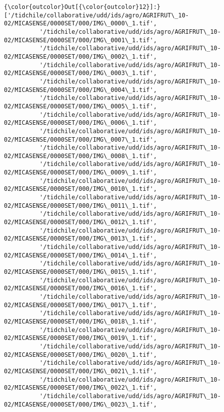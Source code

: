 \documentclass[11pt]{article}
\begin{document}
\begin{Verbatim}[commandchars=\\\{\}]
{\color{outcolor}Out[{\color{outcolor}12}]:} ['/tidchile/collaborative/udd/ids/agro/AGRIFRUT\_10-02/MICASENSE/0000SET/000/IMG\_0000\_1.tif',
          '/tidchile/collaborative/udd/ids/agro/AGRIFRUT\_10-02/MICASENSE/0000SET/000/IMG\_0001\_1.tif',
          '/tidchile/collaborative/udd/ids/agro/AGRIFRUT\_10-02/MICASENSE/0000SET/000/IMG\_0002\_1.tif',
          '/tidchile/collaborative/udd/ids/agro/AGRIFRUT\_10-02/MICASENSE/0000SET/000/IMG\_0003\_1.tif',
          '/tidchile/collaborative/udd/ids/agro/AGRIFRUT\_10-02/MICASENSE/0000SET/000/IMG\_0004\_1.tif',
          '/tidchile/collaborative/udd/ids/agro/AGRIFRUT\_10-02/MICASENSE/0000SET/000/IMG\_0005\_1.tif',
          '/tidchile/collaborative/udd/ids/agro/AGRIFRUT\_10-02/MICASENSE/0000SET/000/IMG\_0006\_1.tif',
          '/tidchile/collaborative/udd/ids/agro/AGRIFRUT\_10-02/MICASENSE/0000SET/000/IMG\_0007\_1.tif',
          '/tidchile/collaborative/udd/ids/agro/AGRIFRUT\_10-02/MICASENSE/0000SET/000/IMG\_0008\_1.tif',
          '/tidchile/collaborative/udd/ids/agro/AGRIFRUT\_10-02/MICASENSE/0000SET/000/IMG\_0009\_1.tif',
          '/tidchile/collaborative/udd/ids/agro/AGRIFRUT\_10-02/MICASENSE/0000SET/000/IMG\_0010\_1.tif',
          '/tidchile/collaborative/udd/ids/agro/AGRIFRUT\_10-02/MICASENSE/0000SET/000/IMG\_0011\_1.tif',
          '/tidchile/collaborative/udd/ids/agro/AGRIFRUT\_10-02/MICASENSE/0000SET/000/IMG\_0012\_1.tif',
          '/tidchile/collaborative/udd/ids/agro/AGRIFRUT\_10-02/MICASENSE/0000SET/000/IMG\_0013\_1.tif',
          '/tidchile/collaborative/udd/ids/agro/AGRIFRUT\_10-02/MICASENSE/0000SET/000/IMG\_0014\_1.tif',
          '/tidchile/collaborative/udd/ids/agro/AGRIFRUT\_10-02/MICASENSE/0000SET/000/IMG\_0015\_1.tif',
          '/tidchile/collaborative/udd/ids/agro/AGRIFRUT\_10-02/MICASENSE/0000SET/000/IMG\_0016\_1.tif',
          '/tidchile/collaborative/udd/ids/agro/AGRIFRUT\_10-02/MICASENSE/0000SET/000/IMG\_0017\_1.tif',
          '/tidchile/collaborative/udd/ids/agro/AGRIFRUT\_10-02/MICASENSE/0000SET/000/IMG\_0018\_1.tif',
          '/tidchile/collaborative/udd/ids/agro/AGRIFRUT\_10-02/MICASENSE/0000SET/000/IMG\_0019\_1.tif',
          '/tidchile/collaborative/udd/ids/agro/AGRIFRUT\_10-02/MICASENSE/0000SET/000/IMG\_0020\_1.tif',
          '/tidchile/collaborative/udd/ids/agro/AGRIFRUT\_10-02/MICASENSE/0000SET/000/IMG\_0021\_1.tif',
          '/tidchile/collaborative/udd/ids/agro/AGRIFRUT\_10-02/MICASENSE/0000SET/000/IMG\_0022\_1.tif',
          '/tidchile/collaborative/udd/ids/agro/AGRIFRUT\_10-02/MICASENSE/0000SET/000/IMG\_0023\_1.tif',

\end{Verbatim}
\end{document}
